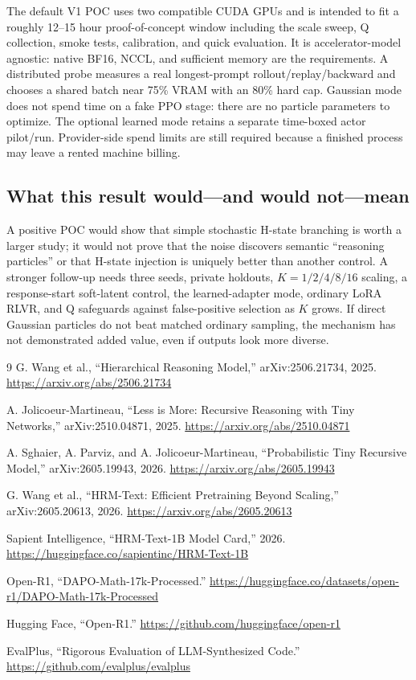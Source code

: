 \documentclass[10pt]{article}
\begin{document}
The default V1 POC uses two compatible CUDA GPUs and is intended to fit a
roughly 12--15 hour proof-of-concept window including the scale sweep, Q
collection, smoke tests, calibration, and quick evaluation. It is
accelerator-model agnostic: native BF16, NCCL, and sufficient memory are the
requirements. A distributed probe measures a real longest-prompt
rollout/replay/backward and chooses a shared batch near 75\% VRAM with an 80\%
hard cap. Gaussian mode does not spend time on a fake PPO stage: there are no
particle parameters to optimize. The optional learned mode retains a separate
time-boxed actor pilot/run. Provider-side spend limits are still required
because a finished process may leave a rented machine billing.

\subsection*{What this result would---and would not---mean}

A positive POC would show that simple stochastic H-state branching is worth a
larger study; it would not prove that the noise discovers semantic ``reasoning
particles'' or that H-state injection is uniquely better than another control.
A stronger follow-up needs three seeds, private holdouts, $K=1/2/4/8/16$
scaling, a response-start soft-latent control, the learned-adapter mode,
ordinary LoRA RLVR, and Q safeguards against false-positive selection as $K$
grows. If direct Gaussian particles do not beat matched ordinary sampling, the
mechanism has not demonstrated added value, even if outputs look more diverse.

\vspace{-0.4em}
\begin{thebibliography}{9}\small
{}
G. Wang et al., ``Hierarchical Reasoning Model,'' arXiv:2506.21734, 2025.
\url{https://arxiv.org/abs/2506.21734}

A. Jolicoeur-Martineau, ``Less is More: Recursive Reasoning with Tiny
Networks,'' arXiv:2510.04871, 2025.
\url{https://arxiv.org/abs/2510.04871}

A. Sghaier, A. Parviz, and A. Jolicoeur-Martineau, ``Probabilistic Tiny
Recursive Model,'' arXiv:2605.19943, 2026.
\url{https://arxiv.org/abs/2605.19943}

G. Wang et al., ``HRM-Text: Efficient Pretraining Beyond Scaling,''
arXiv:2605.20613, 2026.
\url{https://arxiv.org/abs/2605.20613}

Sapient Intelligence, ``HRM-Text-1B Model Card,'' 2026.
\url{https://huggingface.co/sapientinc/HRM-Text-1B}

Open-R1, ``DAPO-Math-17k-Processed.''
\url{https://huggingface.co/datasets/open-r1/DAPO-Math-17k-Processed}

Hugging Face, ``Open-R1.''
\url{https://github.com/huggingface/open-r1}

EvalPlus, ``Rigorous Evaluation of LLM-Synthesized Code.''
\url{https://github.com/evalplus/evalplus}
\end{thebibliography}
\end{document}
